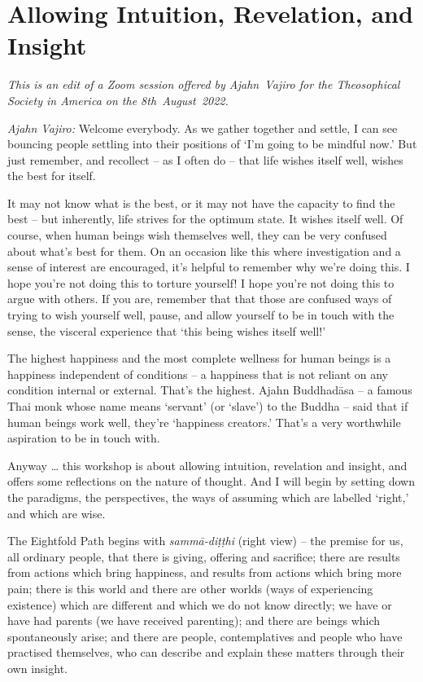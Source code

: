 \chapter{Allowing Intuition, Revelation, and Insight}

{\centering
\begin{minipage}{0.8\linewidth}%
\centering\itshape
This is an edit of a Zoom session offered by Ajahn~Vajiro
for the Theosophical Society in America on the 8th~August~2022.
\end{minipage}
\par}

\bigskip

\emph{Ajahn Vajiro:} Welcome everybody. As we gather together and settle, I can
see bouncing people settling into their positions of `I'm going to be mindful
now.' But just remember, and recollect -- as I often do -- that life wishes
itself well, wishes the best for itself.

It may not know what is the best, or it may not have the capacity to find the
best -- but inherently, life strives for the optimum state. It wishes itself
well. Of course, when human beings wish themselves well, they can be very
confused about what's best for them. On an occasion like this where
investigation and a sense of interest are encouraged, it's helpful to remember
why we're doing this. I hope you're not doing this to torture yourself! I hope
you're not doing this to argue with others. If you are, remember that that those
are confused ways of trying to wish yourself well, pause, and allow yourself to
be in touch with the sense, the visceral experience that `this being wishes
itself well!'

The highest happiness and the most complete wellness for human beings is a
happiness independent of conditions -- a happiness that is not reliant on any
condition internal or external. That's the highest. Ajahn Buddhadāsa -- a famous
Thai monk whose name means `servant' (or `slave') to the Buddha -- said that if
human beings work well, they're `happiness creators.' That's a very worthwhile
aspiration to be in touch with.

Anyway \ldots{} this workshop is about allowing intuition, revelation and
insight, and offers some reflections on the nature of thought. And I will begin
by setting down the paradigms, the perspectives, the ways of assuming which are
labelled `right,' and which are wise.

The Eightfold Path begins with \emph{sammā-diṭṭhi} (right view) -- the premise
for us, all ordinary people, that there is giving, offering and sacrifice; there
are results from actions which bring happiness, and results from actions which
bring more pain; there is this world and there are other worlds (ways of
experiencing existence) which are different and which we do not know directly;
we have or have had parents (we have received parenting); and there are beings
which spontaneously arise; and there are people, contemplatives and people who
have practised themselves, who can describe and explain these matters through
their own insight.

